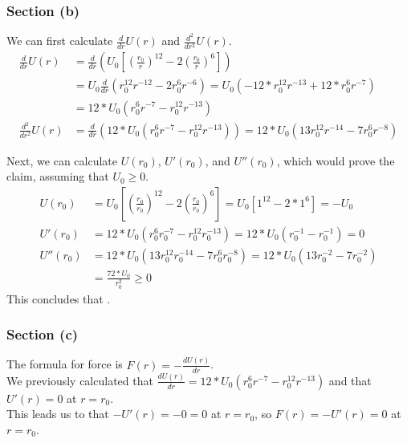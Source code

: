\documentclass[12pt]{article}
\begin{document}
\subsubsection*{Section (b)}
We can first calculate $ \frac{d}{dr}U(r) $ and $ \frac{d^2}{dr^2}U(r) $.
\begin{align*}
    \frac{d}{dr}U(r) &= \frac{d}{dr} \left( U_0\left[ \left(\frac{r_0}{r}\right)^{12} - 2\left(\frac{r_0}{r}\right)^{6} \right] \right)\\
        &=  U_0 \frac{d}{dr} \left( r_0^{12} r^{-12} - 2r_0^{6}r^{-6} \right)
        =  U_0 \left( -12*r_0^{12} r^{-13} + 12*r_0^{6}r^{-7} \right)\\
        &=   12 * U_0 \left( r_0^{6}r^{-7} - r_0^{12} r^{-13} \right)\\
    \frac{d^2}{dr^2}U(r)    &=  \frac{d}{dr}\left(12 * U_0 \left( r_0^{6}r^{-7} - r_0^{12} r^{-13} \right)\right)
        =   12 * U_0 \left( 13r_0^{12} r^{-14} - 7r_0^{6}r^{-8} \right)
\end{align*}

\pagebreak
Next, we can calculate $U(r_0)$, $U'(r_0)$, and $U''(r_0)$, which would prove the claim, assuming that $ U_0 \ge 0 $. 
\begin{align*}
    U(r_0)  &=  U_0\left[ \left(\frac{r_0}{r_0}\right)^{12} - 2\left(\frac{r_0}{r_0}\right)^{6} \right]
        =   U_0\left[ 1^{12} - 2*1^{6} \right] = -U_0\\
    U'(r_0) &=  12 * U_0 \left( r_0^{6}r_0^{-7} - r_0^{12} r_0^{-13} \right)
        =   12 * U_0 \left( r_0^{-1} - r_0^{-1} \right)
        =   0\\
    U''(r_0)    &=  12 * U_0 \left( 13r_0^{12} r_0^{-14} - 7r_0^{6}r_0^{-8} \right)
        =   12 * U_0 \left( 13r_0^{-2} - 7r_0^{-2} \right)\\
        &=  \frac{72*U_0}{r_0^2} 
        \ge 0
\end{align*}
This concludes that .

\subsubsection*{Section (c)}
The formula for force is $ F(r) = -\frac{dU(r)}{dr} $. \\
We previously calculated that $ \frac{dU(r)}{dr} = 12 * U_0 \left( r_0^{6}r^{-7} - r_0^{12} r^{-13} \right) $ and that $ U'(r) = 0 $ at $ r = r_0 $. \\
This leads us to that $ -U'(r) = -0 = 0 $ at $ r = r_0 $, so $ F(r) = -U'(r) = 0 $ at $ r = r_0 $.
\end{document}
